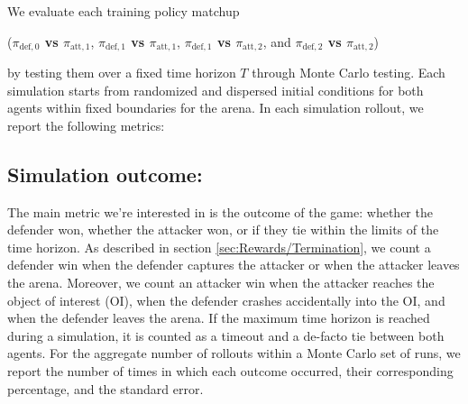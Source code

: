 We evaluate each training policy matchup 

({\boldmath\textbf{$\pi_{\mathrm{def},0}$ vs $\pi_{\mathrm{att},1}$}}, {\boldmath\textbf{$\pi_{\mathrm{def},1}$ vs $\pi_{\mathrm{att},1}$}}, {\boldmath\textbf{$\pi_{\mathrm{def},1}$ vs $\pi_{\mathrm{att},2}$}}, and {\boldmath\textbf{$\pi_{\mathrm{def},2}$ vs $\pi_{\mathrm{att},2}$}})


by testing them over a fixed time horizon \(T\) through Monte Carlo testing. Each simulation starts from randomized and dispersed initial conditions for both agents within fixed boundaries for the arena. In each simulation rollout, we report the following metrics:


\subsection*{Simulation outcome:}

The main metric we're interested in is the outcome of the game: whether the defender won, whether the attacker won, or if they tie within the limits of the time horizon. As described in section \ref{sec:Rewards/Termination}, we count a defender win when the defender captures the attacker or when the attacker leaves the arena. Moreover, we count an attacker win when the attacker reaches the object of interest (OI), when the defender crashes accidentally into the OI, and when the defender leaves the arena. If the maximum time horizon is reached during a simulation, it is counted as a timeout and a de-facto tie between both agents. For the aggregate number of rollouts within a Monte Carlo set of runs, we report the number of times in which each outcome occurred, their corresponding percentage, and the standard error.





